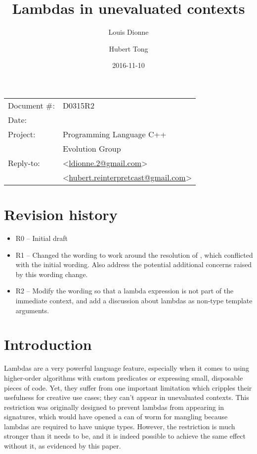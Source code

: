 \documentclass[11pt]{article}
\date{}
\title{Lambdas in unevaluated contexts}
\author{}
\begin{document}
\maketitle\vspace{-2cm}

\begin{flushright}
  \begin{tabular}{ll}
  Document \#:&D0315R2\\
  Date:       &\date{2016-11-10}\\
  Project:    &Programming Language C++\\
              &Evolution Group\\
  Reply-to:   &\author{Louis Dionne} \textless\href{mailto:ldionne.2@gmail.com}{ldionne.2@gmail.com}\textgreater\\
              &\author{Hubert Tong} \textless\href{mailto:hubert.reinterpretcast@gmail.com}{hubert.reinterpretcast@gmail.com}\textgreater
  \end{tabular}
\end{flushright}

\section{Revision history}
\begin{itemize}
  \item R0 -- Initial draft
  \item R1 -- Changed the wording to work around the resolution of \cite{DR1607},
              which conflicted with the initial wording. Also address the
              potential additional concerns raised by this wording change.
  \item R2 -- Modify the wording so that a lambda expression is not part of
              the immediate context, and add a discussion about lambdas as
              non-type template arguments.
\end{itemize}


\section{Introduction}
Lambdas are a very powerful language feature, especially when it comes to using
higher-order algorithms with custom predicates or expressing small, disposable
pieces of code. Yet, they suffer from one important limitation which cripples
their usefulness for creative use cases; they can't appear in unevaluated
contexts. This restriction was originally designed to prevent lambdas from
appearing in signatures, which would have opened a can of worm for mangling
because lambdas are required to have unique types. However, the restriction is
much stronger than it needs to be, and it is indeed possible to achieve the
same effect without it, as evidenced by this paper.
\end{document}
